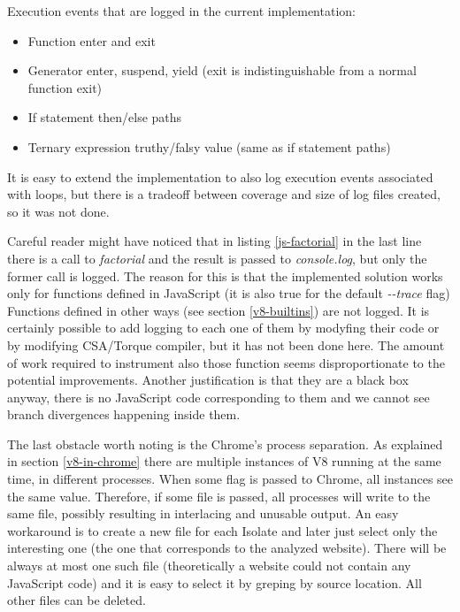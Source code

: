 Execution events that are logged in the current implementation:
\begin{itemize}
  \item Function enter and exit
  \item Generator enter, suspend, yield (exit is indistinguishable from a normal function exit)
  \item If statement then/else paths
  \item Ternary expression truthy/falsy value (same as if statement paths)
\end{itemize}

It is easy to extend the implementation to also log execution events associated with loops, but there
is a tradeoff between coverage and size of log files created, so it was not done.
	


Careful reader might have noticed that in listing \ref{js-factorial} in the last line there is a call to \emph{factorial}
and the result is passed to \emph{console.log}, but only the former call is logged.
The reason for this is that the implemented solution works only for functions defined in JavaScript
(it is also true for the default \emph{-{}-trace} flag)
Functions defined in other ways (see section \ref{v8-builtins}) are not logged. It is certainly possible
to add logging to each one of them by modyfing their code or by modifying CSA/Torque compiler,
but it has not been done here. The amount of work required to instrument also those function
seems disproportionate to the potential improvements. Another justification is that they are
a black box anyway, there is no JavaScript code corresponding to them 
and we cannot see branch divergences happening inside them.

The last obstacle worth noting is the Chrome's process separation. As explained in section \ref{v8-in-chrome}
there are multiple instances of V8 running at the same time, in different processes.
When some flag is passed to Chrome, all instances see the same value. Therefore, if some file is passed,
all processes will write to the same file, possibly resulting in interlacing and unusable output. 
An easy workaround is to create a new file for each Isolate and later just select only the interesting one 
(the one that corresponds to the analyzed website). There will be always at most one such file 
(theoretically a website could not contain any JavaScript code) and it is easy to select it by greping 
by source location. All other files can be deleted.

